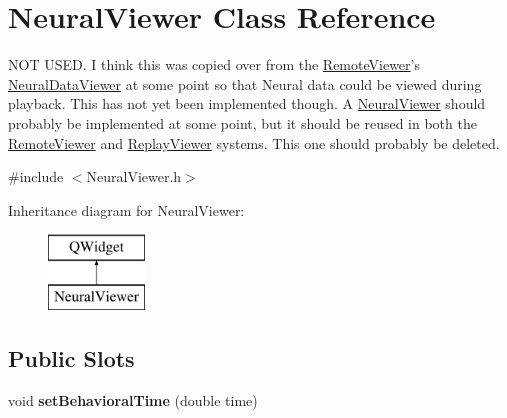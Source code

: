 \hypertarget{class_neural_viewer}{\section{Neural\-Viewer Class Reference}
\label{class_neural_viewer}
}


N\-O\-T U\-S\-E\-D. I think this was copied over from the \hyperlink{class_remote_viewer}{Remote\-Viewer}'s \hyperlink{class_neural_data_viewer}{Neural\-Data\-Viewer} at some point so that Neural data could be viewed during playback. This has not yet been implemented though. A \hyperlink{class_neural_viewer}{Neural\-Viewer} should probably be implemented at some point, but it should be reused in both the \hyperlink{class_remote_viewer}{Remote\-Viewer} and \hyperlink{class_replay_viewer}{Replay\-Viewer} systems. This one should probably be deleted.  




{\ttfamily \#include $<$Neural\-Viewer.\-h$>$}

Inheritance diagram for Neural\-Viewer\-:\begin{figure}[H]
\begin{center}
\leavevmode
\includegraphics[height=2.000000cm]{class_neural_viewer}
\end{center}
\end{figure}
\subsection*{Public Slots}
\begin{DoxyCompactItemize}
\item 
\hypertarget{class_neural_viewer_a22bb3dc1402f8b22f69e8e556de5064b}{void {\bfseries set\-Behavioral\-Time} (double time)}\label{class_neural_viewer_a22bb3dc1402f8b22f69e8e556de5064b}

\end{DoxyCompactItemize}
